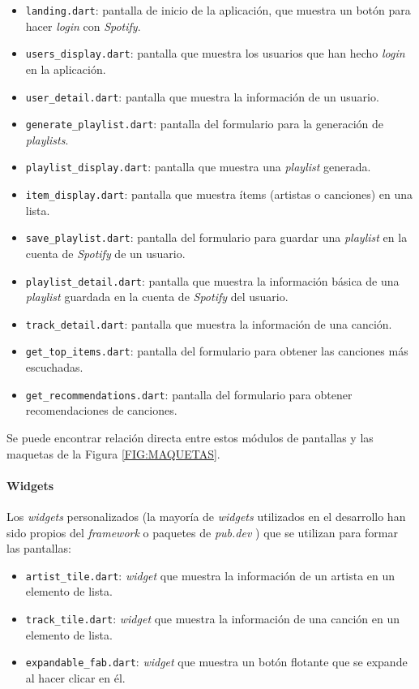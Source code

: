\begin{itemize}
  \item \texttt{landing.dart}: pantalla de inicio de la aplicación, que muestra un botón para hacer \textit{login} con \textit{Spotify}.
  \item \texttt{users\_display.dart}: pantalla que muestra los usuarios que han hecho \textit{login} en la aplicación.
  \item \texttt{user\_detail.dart}: pantalla que muestra la información de un usuario.
  \item \texttt{generate\_playlist.dart}: pantalla del formulario para la generación de \textit{playlists}.
  \item \texttt{playlist\_display.dart}: pantalla que muestra una \textit{playlist} generada.
  \item \texttt{item\_display.dart}: pantalla que muestra ítems (artistas o canciones) en una lista.
  \item \texttt{save\_playlist.dart}: pantalla del formulario para guardar una \textit{playlist} en la cuenta de \textit{Spotify} de un usuario.
  \item \texttt{playlist\_detail.dart}: pantalla que muestra la información básica de una \textit{playlist} guardada
  en la cuenta de \textit{Spotify} del usuario.
  \item \texttt{track\_detail.dart}: pantalla que muestra la información de una canción.
  \item \texttt{get\_top\_items.dart}: pantalla del formulario para obtener las canciones más escuchadas.
  \item \texttt{get\_recommendations.dart}: pantalla del formulario para obtener recomendaciones de canciones.
\end{itemize}

Se puede encontrar relación directa entre estos módulos de pantallas y las maquetas de la Figura \ref{FIG:MAQUETAS}.

\paragraph{Widgets}

Los \textit{widgets} personalizados (la mayoría de \textit{widgets} utilizados en el desarrollo han sido propios del \textit{framework} o paquetes de \textit{pub.dev} \cite{pub_dev}) que 
se utilizan para formar las pantallas:

\begin{itemize}
  \item \texttt{artist\_tile.dart}: \textit{widget} que muestra la información de un artista en un elemento de lista.
  \item \texttt{track\_tile.dart}: \textit{widget} que muestra la información de una canción en un elemento de lista.
  \item \texttt{expandable\_fab.dart}: \textit{widget} que muestra un botón flotante que se expande al hacer clicar en él.
\end{itemize}


